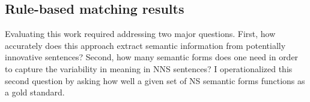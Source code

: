 %
%
%

\subsection{Rule-based matching results}
\label{sec:rule-results}

Evaluating this work required addressing two major questions.  First,
how accurately does this approach extract semantic information from potentially
innovative sentences?
Second, how many semantic forms does one need in order to capture the variability in meaning in NNS sentences? I operationalized this second question by asking how well a given set of NS semantic forms functions as a gold standard.

